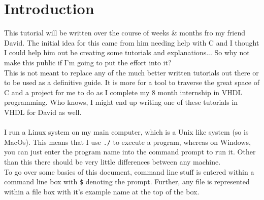 \section{Introduction}
This tutorial will be written over the course of weeks \& months fro my friend David. The initial idea for this came from him needing help with C and I thought I could help him out be creating some tutorials and explanations... So why not make this public if I'm going to put the effort into it?\\
This is not meant to replace any of the much better written tutorials out there or to be used as a definitive guide. It is more for a tool to traverse the great space of C and a project for me to do as I complete my 8 month internship in VHDL programming. Who knows, I might end up writing one of these tutorials in VHDL for David as well.\\
\\I run a Linux system on my main computer, which is a Unix like system (so is MacOs). This means that I use \texttt{./} to execute a program, whereas on Windows, you can just enter the program name into the command prompt to run it. Other than this there should be very little differences between any machine.
\\To go over some basics of this document, command line stuff is entered within a command line box with \texttt{\$} denoting the prompt. Further, any file is represented within a file box with it's example name at the top of the box. 
